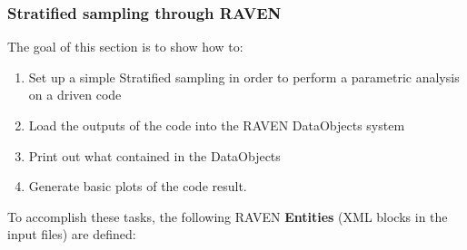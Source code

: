 \subsubsection{Stratified sampling through RAVEN}
\label{subsub:Stratifiedexample}
The goal of this section is to show how to:
 \begin{enumerate}
   \item Set up a simple Stratified sampling in order to perform a parametric analysis on a driven code
   \item Load the outputs of the code into the RAVEN DataObjects system
   \item Print out what contained in the DataObjects
   \item Generate basic plots of the code result.
\end{enumerate}
To accomplish these tasks, the following RAVEN \textbf{Entities} (XML blocks in the input files) are defined:
